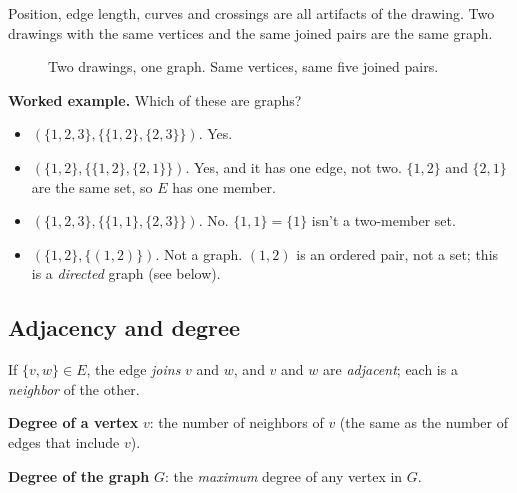 Position, edge length, curves and crossings are all artifacts of the drawing. Two drawings with the same vertices and the same joined pairs are the same graph.

\begin{figure}[H]
\centering
{}
\caption{Two drawings, one graph. Same vertices, same five joined pairs.}
\end{figure}

\textbf{Worked example.} Which of these are graphs?
\begin{itemize}
\item $(\{1,2,3\},\{\{1,2\},\{2,3\}\})$. Yes.
\item $(\{1,2\},\{\{1,2\},\{2,1\}\})$. Yes, and it has one edge, not two. $\{1,2\}$ and $\{2,1\}$ are the same set, so $E$ has one member.
\item $(\{1,2,3\},\{\{1,1\},\{2,3\}\})$. No. $\{1,1\}=\{1\}$ isn't a two-member set.
\item $(\{1,2\},\{(1,2)\})$. Not a graph. $(1,2)$ is an ordered pair, not a set; this is a \emph{directed} graph (see below).
\end{itemize}

\subsection{Adjacency and degree}

\begin{notebox}
If $\{v,w\}\in E$, the edge \emph{joins} $v$ and $w$, and $v$ and $w$ are \emph{adjacent}; each is a \emph{neighbor} of the other.

\textbf{Degree of a vertex} $v$: the number of neighbors of $v$ (the same as the number of edges that include $v$).

\textbf{Degree of the graph} $G$: the \emph{maximum} degree of any vertex in $G$.
\end{notebox}

